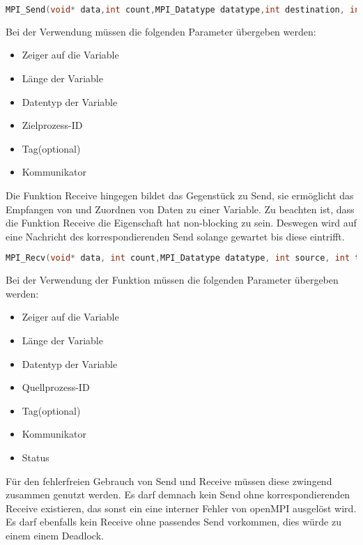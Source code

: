 \begin{lstlisting}[language=C]
MPI_Send(void* data,int count,MPI_Datatype datatype,int destination, int tag, MPI_Comm communicator)
\end{lstlisting}

Bei der Verwendung müssen die folgenden Parameter übergeben werden:

\begin{itemize}
\item Zeiger auf die Variable
\item Länge der Variable
\item Datentyp der Variable
\item Zielprozess-ID
\item Tag(optional)
\item Kommunikator
\end{itemize}

Die Funktion Receive hingegen bildet das Gegenstück zu Send, sie ermöglicht das Empfangen von  und Zuordnen von Daten zu einer Variable. Zu beachten ist, dass die Funktion Receive die Eigenschaft hat non-blocking zu sein. Deswegen wird auf eine Nachricht des korrespondierenden  Send solange gewartet bis diese eintrifft. %

\begin{lstlisting}[language=C]
MPI_Recv(void* data, int count,MPI_Datatype datatype, int source, int tag, MPI_Comm communicator,MPI_Status* status)
\end{lstlisting}

Bei der Verwendung der Funktion müssen die folgenden Parameter übergeben werden:

\begin{itemize}
\item Zeiger auf die Variable
\item Länge der Variable
\item Datentyp der Variable
\item Quellprozess-ID
\item Tag(optional)
\item Kommunikator
\item Status
\end{itemize}

Für den fehlerfreien Gebrauch von Send und Receive müssen diese zwingend zusammen genutzt werden. Es darf demnach kein Send ohne korrespondierenden Receive existieren, das sonst ein eine interner Fehler von openMPI ausgelöst wird. Es darf ebenfalls kein Receive ohne passendes Send vorkommen, dies würde zu einem einem Deadlock.

